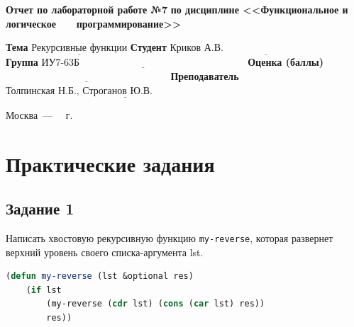 \documentclass[12pt]{report}
\begin{document}
\begin{titlepage}
		\begin{center}
			\noindent\begin{minipage}{1.1\textwidth}\centering
				\Large\textbf{  Отчет по лабораторной работе №7}\newline
				\textbf{по дисциплине <<Функциональное и логическое}\newline
				\textbf{~~~программирование>>}\newline\newline
			\end{minipage}
		\end{center}
		
		\noindent\textbf{Тема} $\underline{\text{Рекурсивные функции}}$\newline\newline
		\noindent\textbf{Студент} $\underline{\text{Криков А.В.~~~~~~~~~~~~~~~~~~~~~~~~~~~~~~~~~~~~~~~~~~}}$\newline\newline
		\noindent\textbf{Группа} $\underline{\text{ИУ7-63Б~~~~~~~~~~~~~~~~~~~~~~~~~~~~~~~~~~~~~~~~~~~~~~~~~~}}$\newline\newline
		\noindent\textbf{Оценка (баллы)} $\underline{\text{~~~~~~~~~~~~~~~~~~~~~~~~~~~~~~~~~~~~~~~~~~~~~~~~~}}$\newline\newline
		\noindent\textbf{Преподаватель} $\underline{\text{Толпинская Н.Б., Строганов Ю.В.~~~~~~~~~~~~~~~~~~~~~~~~~~~~}}$\newline\newline\newline
		
		\begin{center}
			\vfill
			Москва~---~\the\year
			~г.
		\end{center}
	\end{titlepage}
	
	


\chapter*{Практические задания}

	
\section*{Задание 1}
Написать хвостовую рекурсивную функцию \texttt{my-reverse}, которая развернет верхний уровень своего списка-аргумента lst.

\begin{lstlisting}[language=Lisp]
(defun my-reverse (lst &optional res)
	(if lst
		(my-reverse (cdr lst) (cons (car lst) res))
		res))
\end{lstlisting}
\end{document}
